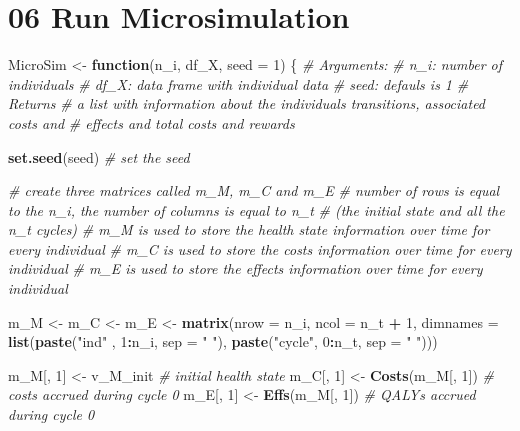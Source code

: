 \documentclass[
]{article}
\newenvironment{Shaded}{\begin{snugshade}}{\end{snugshade}}
\newcommand{\CommentTok}[1]{\textcolor[rgb]{0.56,0.35,0.01}{\textit{#1}}}
\newcommand{\ControlFlowTok}[1]{\textcolor[rgb]{0.13,0.29,0.53}{\textbf{#1}}}
\newcommand{\DataTypeTok}[1]{\textcolor[rgb]{0.13,0.29,0.53}{#1}}
\newcommand{\DecValTok}[1]{\textcolor[rgb]{0.00,0.00,0.81}{#1}}
\newcommand{\KeywordTok}[1]{\textcolor[rgb]{0.13,0.29,0.53}{\textbf{#1}}}
\newcommand{\NormalTok}[1]{#1}
\newcommand{\OperatorTok}[1]{\textcolor[rgb]{0.81,0.36,0.00}{\textbf{#1}}}
\newcommand{\StringTok}[1]{\textcolor[rgb]{0.31,0.60,0.02}{#1}}
\begin{document}
\hypertarget{run-microsimulation}{%
\section{06 Run Microsimulation}\label{run-microsimulation}}

\begin{Shaded}
\begin{Highlighting}[]
\NormalTok{MicroSim <-}\StringTok{ }\ControlFlowTok{function}\NormalTok{(n_i, df_X, }\DataTypeTok{seed =} \DecValTok{1}\NormalTok{) \{}
\CommentTok{# Arguments:  }
  \CommentTok{# n_i:     number of individuals}
  \CommentTok{# df_X:    data frame with individual data }
  \CommentTok{# seed:    defauls is 1}
\CommentTok{# Returns}
  \CommentTok{# a list with information about the individuals transitions, associated costs and }
  \CommentTok{# effects and total costs and rewards }
  
  \KeywordTok{set.seed}\NormalTok{(seed) }\CommentTok{# set the seed}
  
  \CommentTok{# create three matrices called m_M, m_C and m_E}
  \CommentTok{# number of rows is equal to the n_i, the number of columns is equal to n_t }
  \CommentTok{# (the initial state and all the n_t cycles)}
  \CommentTok{# m_M is used to store the health state information over time for every individual}
  \CommentTok{# m_C is used to store the costs information over time for every individual}
  \CommentTok{# m_E is used to store the effects information over time for every individual}
  
\NormalTok{  m_M <-}\StringTok{ }\NormalTok{m_C <-}\StringTok{ }\NormalTok{m_E <-}\StringTok{  }\KeywordTok{matrix}\NormalTok{(}\DataTypeTok{nrow =}\NormalTok{ n_i, }\DataTypeTok{ncol =}\NormalTok{ n_t }\OperatorTok{+}\StringTok{ }\DecValTok{1}\NormalTok{, }
                                       \DataTypeTok{dimnames =} \KeywordTok{list}\NormalTok{(}\KeywordTok{paste}\NormalTok{(}\StringTok{"ind"}\NormalTok{  , }\DecValTok{1}\OperatorTok{:}\NormalTok{n_i, }\DataTypeTok{sep =} \StringTok{" "}\NormalTok{), }
                                                       \KeywordTok{paste}\NormalTok{(}\StringTok{"cycle"}\NormalTok{, }\DecValTok{0}\OperatorTok{:}\NormalTok{n_t, }\DataTypeTok{sep =} \StringTok{" "}\NormalTok{)))  }
 
\NormalTok{  m_M[, }\DecValTok{1}\NormalTok{] <-}\StringTok{ }\NormalTok{v_M_init          }\CommentTok{# initial health state }
\NormalTok{  m_C[, }\DecValTok{1}\NormalTok{] <-}\StringTok{ }\KeywordTok{Costs}\NormalTok{(m_M[, }\DecValTok{1}\NormalTok{])   }\CommentTok{# costs accrued during cycle 0}
\NormalTok{  m_E[, }\DecValTok{1}\NormalTok{] <-}\StringTok{ }\KeywordTok{Effs}\NormalTok{(m_M[, }\DecValTok{1}\NormalTok{])    }\CommentTok{# QALYs accrued during cycle 0}
  

\end{Highlighting}
\end{Shaded}
\end{document}
